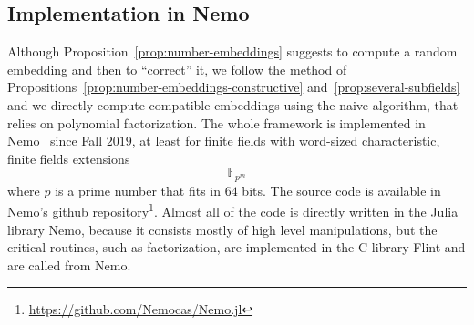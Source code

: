 \subsection{Implementation in Nemo}
\label{sec:bcs-implem}

Although Proposition~\ref{prop:number-embeddings} suggests to compute a random
embedding and then to ``correct'' it, we follow the method of
Propositions~\ref{prop:number-embeddings-constructive} and~\ref{prop:several-subfields} and
we directly compute compatible embeddings using the naive algorithm, that relies
on polynomial factorization. The whole framework is implemented in
Nemo~\cite{Nemo} since Fall $2019$, at least for finite fields with
word-sized characteristic, \ie finite fields extensions
\[
  \mathbb{F}_{p^m}
\]
where $p$ is a prime number that fits in $64$ bits. The source code is available
in Nemo's github repository\footnote{\url{https://github.com/Nemocas/Nemo.jl}}.
Almost all of the code is directly written in the Julia library Nemo, because it
consists mostly of high level manipulations, but the critical routines, such as
factorization, are implemented in the C library Flint and are called from Nemo.

